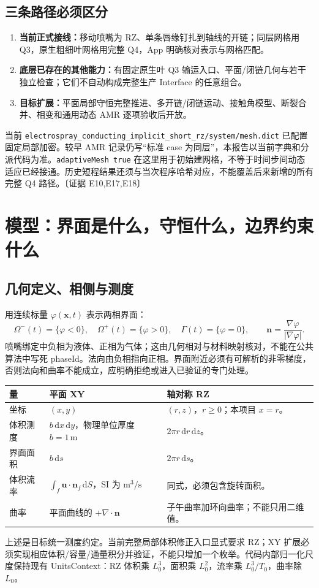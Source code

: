 \documentclass[UTF8,a4paper,11pt,fontset=fandol]{ctexart}
\newcommand{\code}[1]{\nolinkurl{#1}}
\newcommand{\ev}[1]{{\small\color{muted}〔证据 #1〕}}
\newcommand{\dd}{\,\mathrm d}
\newcommand{\uu}{\bm u}\newcommand{\nn}{\bm n}\newcommand{\xx}{\bm x}
\newcommand{\ph}{\varphi}\newcommand{\dt}{\Delta t}
\begin{document}
\subsection{三条路径必须区分}
\begin{enumerate}
\item \textbf{当前正式接线：}移动喷嘴为 RZ、单条唇缘钉扎到轴线的开链；同层网格用 Q3，原生粗细叶网格用完整 Q4，App 明确核对表示与网格匹配。
\item \textbf{底层已存在的其他能力：}有固定原生叶 Q3 输运入口、平面/闭链几何与若干独立检查；它们不自动构成完整生产 Interface 的任意组合。
\item \textbf{目标扩展：}平面局部守恒完整推进、多开链/闭链运动、接触角模型、断裂合并、相变和通用动态 AMR 逐项验收后开放。
\end{enumerate}
当前 \code{electrospray_conducting_implicit_short_rz/system/mesh.dict} 已配置固定局部加密。较早 AMR 记录仍写“标准 case 为同层”，本报告以当前字典和分派代码为准。\texttt{adaptiveMesh true} 在这里用于初始建网格，不等于时间步间动态适应已经接通。历史短程结果还须与当次程序哈希对应，不能覆盖后来新增的所有完整 Q4 路径。\ev{E10,E17,E18}

\section{模型：界面是什么，守恒什么，边界约束什么}
\subsection{几何定义、相侧与测度}
用连续标量 $\ph(\xx,t)$ 表示两相界面：
\begin{equation}
\Omega^-(t)=\{\ph<0\},\quad\Omega^+(t)=\{\ph>0\},\quad
\Gamma(t)=\{\ph=0\},\qquad \nn=\frac{\nabla\ph}{|\nabla\ph|}.
\label{eq:definition}
\end{equation}
喷嘴绑定中负相为液体、正相为气体；这由几何相对与材料映射核对，不能在公共算法中写死 phaseId。法向由负相指向正相。界面附近必须有可解析的非零梯度，否则法向和曲率不能成立，应明确拒绝或进入已验证的专门处理。

\begin{longtable}{@{}P{.20\textwidth}P{.35\textwidth}P{.39\textwidth}@{}}
\toprule 量 & 平面 XY & 轴对称 RZ\\\midrule\endhead
坐标 & $(x,y)$ & $(r,z)$，$r\ge0$；本项目 $x=r$。\\
体积测度 & $b\dd x\dd y$，物理单位厚度 $b=1\,\mathrm m$ & $2\pi r\dd r\dd z$。\\
界面面积 & $b\dd s$ & $2\pi r\dd s$。\\
体积流率 & $\int_f\uu\cdot\nn_f\dd S$，SI 为 $\mathrm{m^3/s}$ & 同式，必须包含旋转面积。\\
曲率 & 平面曲线的 $+\nabla\cdot\nn$ & 子午曲率加环向曲率；不能只用二维值。\\
\bottomrule
\end{longtable}
上述是目标统一测度约定。当前完整局部体积修正入口显式要求 RZ；XY 扩展必须实现相应体积/容量/通量积分并验证，不能只增加一个枚举。代码内部归一化尺度保持现有 UnitsContext：RZ 体积乘 $L_0^3$，面积乘 $L_0^2$，流率乘 $L_0^3/T_0$，曲率除 $L_0$。
\end{document}
